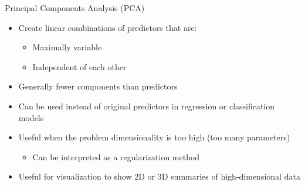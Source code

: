 \documentclass[ignorenonframetext,xcolor=x11names]{beamer}
\begin{document}
\begin{frame}{Principal Components Analysis (PCA)}
\begin{itemize}
  \item Create linear combinations of predictors that are:
  \begin{itemize}
     \item Maximally variable
     \item Independent of each other
  \end{itemize}
  \item Generally fewer components than predictors
  \item Can be used instead of original predictors in regression or classification models
  \item Useful when the problem dimensionality is too high (too many parameters)
  \begin{itemize}
     \item Can be interpreted as a regularization method
  \end{itemize}
  \item Useful for visualization to show 2D or 3D summaries of high-dimensional data
\end{itemize}
\end{frame}
\end{document}
